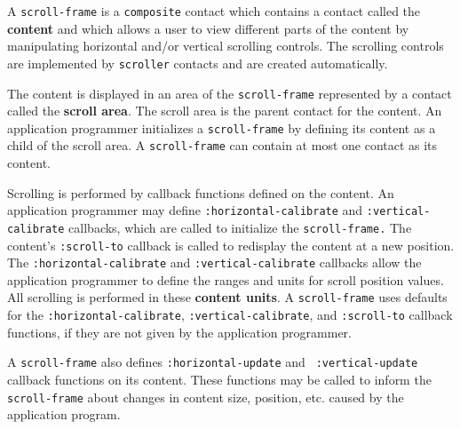 \vfill\pagebreak


A {\tt scroll-frame} is a {\tt composite} contact which contains a contact
called the {\bf content}
and which allows a user to view different parts of the content
by manipulating horizontal and/or vertical scrolling controls.  The
scrolling controls are implemented by {\tt scroller} contacts and are
created automatically.  

The content is displayed in an area of the {\tt scroll-frame} represented by a
contact called the {\bf scroll area}. The
scroll area is the parent contact for the content.  An application programmer
initializes a {\tt scroll-frame} by defining its content as a child of the
scroll area.  A {\tt scroll-frame} can contain at most one contact as its
content.

Scrolling is performed by callback functions defined on the content.  An
application programmer may define {\tt :horizontal-calibrate} and
{\tt :vertical-calibrate} callbacks, which are called to initialize the
{\tt scroll-frame.}  The content's {\tt :scroll-to} callback is called to
redisplay the content at a new position.  The {\tt :horizontal-calibrate}
and {\tt :vertical-calibrate}
callbacks allow the application programmer to define the ranges and units
for scroll position values.  All scrolling is performed in these
{\bf content units}. 
A {\tt scroll-frame} uses defaults for the
{\tt :horizontal-calibrate}, {\tt :vertical-calibrate}, and {\tt :scroll-to}
callback functions, if they are not given by the application programmer.

A {\tt scroll-frame} also defines {\tt :horizontal-update} and {\tt
:vertical-update} callback functions on its content.  These functions may be
called to inform the {\tt scroll-frame} about changes in content size, position,
etc.  caused by the application program.





